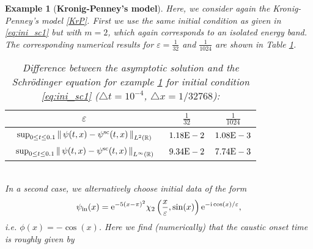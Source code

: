 \documentclass[leqno,final]{siamltex}
\makeatletter
\newtheorem{example}{Example}[section]
{\catcode `\@=11 \global\let\AddToReset=\@addtoreset}
\numberwithin{equation}{section}
\newcounter{me}
\makeatother
\begin{document}
\begin{example}[\textbf{Kronig-Penney's model}]\label{nuscex2}
Here, we consider again the Kronig-Penney's model \eqref{KrP}.
First we use the same initial condition as given in
\eqref{eq:ini_sc1} but with $m=2$, which again corresponds to an
isolated energy band. The corresponding numerical results for
${{\varepsilon }}={\frac{{1}}{{32}}}$ and ${\frac{{1}}{{1024}}}$ are shown in Table \ref{tb02}.
\begin{table}[htbp]
\caption{Difference between the asymptotic solution and the
Schr\"odinger equation for example \ref{nuscex2} for initial
condition \eqref{eq:ini_sc1} (${\triangle} t=10^{-4}$, ${\triangle}
x=1/32768$):}\label{tb02}
\begin{center}\footnotesize

\begin{tabular}{ccc}\hline
${{\varepsilon }}$ &         ${\frac{{1}}{{32}}}$ & ${\frac{{1}}{{1024}}}$ \\ \hline 
$\begin{array}{c}\vspace{-4mm}\\ {\displaystyle}\sup_{0\le t\le 0.1}\left\|\, \psi
(t,x) - \psi^{\rm sc} (t,x) \, \right\|_{L^{2}({{\mathbb R}})}\end{array}$ &
$1.18{\rm{E}}-2$ & $1.08{\rm{E}}-3$ \vspace*{0.5mm}\\ \hline
$\begin{array}{c}\vspace{-4mm}\\ {\displaystyle}\sup_{0\le t\le 0.1}\left\|\, \psi
(t,x) - \psi^{\rm sc} (t,x) \, \right\|_{L^{\infty}({{\mathbb R}})}\end{array}$ &
$9.34{\rm{E}}-2$ & $7.74{\rm{E}}-3$ \vspace*{0.5mm}\\ \hline
\end{tabular}
\end{center}
\end{table}\\
In a second case, we alternatively choose initial data of the form
\begin{equation}\label{eq:ini_sc2} \psi_{\rm
in}(x)={\mathrm{e}}^{-5(x-\pi)^2}\chi_{2}\left(\frac{x}{{\varepsilon }} ,\sin(x)\right)
{\mathrm{e}}^{-{\mathrm{i}} \cos(x)/{{\varepsilon }}}, \end{equation} {{\sl i.e.\/ }} $\phi(x)= - \cos(x)$. Here we find
(numerically) that the caustic onset time is roughly given by

\end{example}
\end{document}
